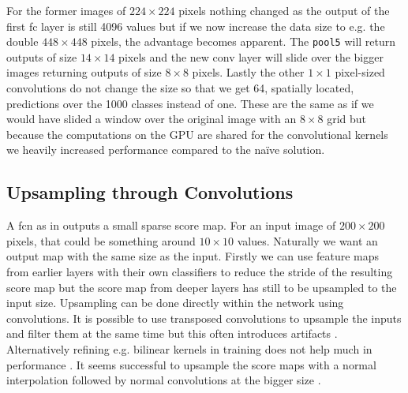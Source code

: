 For the former images of $224\times224$ pixels nothing changed as the output of the first \gls{fc} layer is still 4096 values but if we now increase the data size to e.g. the double $448\times448$ pixels, the advantage becomes apparent. The \texttt{pool5} will return outputs of size $14\times14$ pixels and the new \gls{conv} layer will slide over the bigger images returning outputs of size $8\times8$ pixels. Lastly the other $1\times1$ pixel-sized convolutions do not change the size so that we get 64, spatially located, predictions over the 1000 classes instead of one. These are the same as if we would have slided a window over the original image with an $8\times8$ grid but because the computations on the GPU are shared for the convolutional kernels we heavily increased performance compared to the naïve solution.

\subsection{Upsampling through Convolutions}
\label{sub:concepts:fcn:upsampling}
A \gls{fcn} as in \citep{long_fully_2015} outputs a small sparse score map. For an input image of $200\times 200$ pixels, that could be something around $10\times 10$ values. Naturally we want an output map with the same size as the input. Firstly we can use feature maps from earlier layers with their own classifiers to reduce the stride of the resulting score map but the score map from deeper layers has still to be upsampled to the input size. Upsampling can be done directly within the network using convolutions. It is possible to use transposed convolutions to upsample the inputs and filter them at the same time but this often introduces artifacts \citep{odena_deconvolution_2016}. Alternatively refining e.g. bilinear kernels in training does not help much in performance \citep{shelhamer_fully_2016}. It seems successful to upsample the score maps with a normal interpolation followed by normal convolutions at the bigger size \citep{dong_image_2016}.

